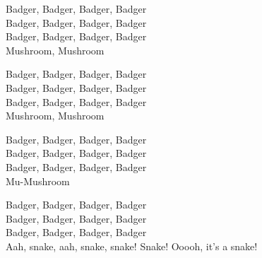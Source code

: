 \vspace{10pt}
Badger, Badger, Badger, Badger\\
Badger, Badger, Badger, Badger\\
Badger, Badger, Badger, Badger\\
Mushroom, Mushroom\par
\vspace{10pt}
Badger, Badger, Badger, Badger\\
Badger, Badger, Badger, Badger\\
Badger, Badger, Badger, Badger\\
Mushroom, Mushroom\par
\vspace{10pt}
Badger, Badger, Badger, Badger\\
Badger, Badger, Badger, Badger\\
Badger, Badger, Badger, Badger\\
Mu-Mushroom\par
\vspace{10pt}
Badger, Badger, Badger, Badger\\
Badger, Badger, Badger, Badger\\
Badger, Badger, Badger, Badger\\
Aah, snake, aah, snake, snake! Snake! Ooooh, it's a snake!
